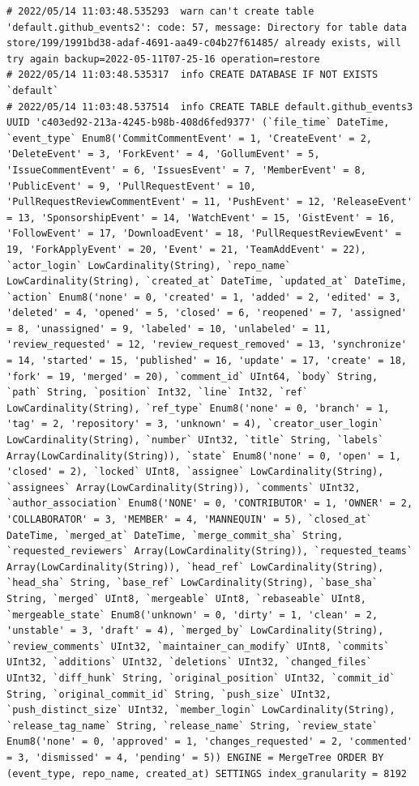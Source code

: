 \begin{verbatim}
# 2022/05/14 11:03:48.535293  warn can't create table 'default.github_events2': code: 57, message: Directory for table data store/199/1991bd38-adaf-4691-aa49-c04b27f61485/ already exists, will try again backup=2022-05-11T07-25-16 operation=restore
# 2022/05/14 11:03:48.535317  info CREATE DATABASE IF NOT EXISTS `default`
# 2022/05/14 11:03:48.537514  info CREATE TABLE default.github_events3 UUID 'c403ed92-213a-4245-b98b-408d6fed9377' (`file_time` DateTime, `event_type` Enum8('CommitCommentEvent' = 1, 'CreateEvent' = 2, 'DeleteEvent' = 3, 'ForkEvent' = 4, 'GollumEvent' = 5, 'IssueCommentEvent' = 6, 'IssuesEvent' = 7, 'MemberEvent' = 8, 'PublicEvent' = 9, 'PullRequestEvent' = 10, 'PullRequestReviewCommentEvent' = 11, 'PushEvent' = 12, 'ReleaseEvent' = 13, 'SponsorshipEvent' = 14, 'WatchEvent' = 15, 'GistEvent' = 16, 'FollowEvent' = 17, 'DownloadEvent' = 18, 'PullRequestReviewEvent' = 19, 'ForkApplyEvent' = 20, 'Event' = 21, 'TeamAddEvent' = 22), `actor_login` LowCardinality(String), `repo_name` LowCardinality(String), `created_at` DateTime, `updated_at` DateTime, `action` Enum8('none' = 0, 'created' = 1, 'added' = 2, 'edited' = 3, 'deleted' = 4, 'opened' = 5, 'closed' = 6, 'reopened' = 7, 'assigned' = 8, 'unassigned' = 9, 'labeled' = 10, 'unlabeled' = 11, 'review_requested' = 12, 'review_request_removed' = 13, 'synchronize' = 14, 'started' = 15, 'published' = 16, 'update' = 17, 'create' = 18, 'fork' = 19, 'merged' = 20), `comment_id` UInt64, `body` String, `path` String, `position` Int32, `line` Int32, `ref` LowCardinality(String), `ref_type` Enum8('none' = 0, 'branch' = 1, 'tag' = 2, 'repository' = 3, 'unknown' = 4), `creator_user_login` LowCardinality(String), `number` UInt32, `title` String, `labels` Array(LowCardinality(String)), `state` Enum8('none' = 0, 'open' = 1, 'closed' = 2), `locked` UInt8, `assignee` LowCardinality(String), `assignees` Array(LowCardinality(String)), `comments` UInt32, `author_association` Enum8('NONE' = 0, 'CONTRIBUTOR' = 1, 'OWNER' = 2, 'COLLABORATOR' = 3, 'MEMBER' = 4, 'MANNEQUIN' = 5), `closed_at` DateTime, `merged_at` DateTime, `merge_commit_sha` String, `requested_reviewers` Array(LowCardinality(String)), `requested_teams` Array(LowCardinality(String)), `head_ref` LowCardinality(String), `head_sha` String, `base_ref` LowCardinality(String), `base_sha` String, `merged` UInt8, `mergeable` UInt8, `rebaseable` UInt8, `mergeable_state` Enum8('unknown' = 0, 'dirty' = 1, 'clean' = 2, 'unstable' = 3, 'draft' = 4), `merged_by` LowCardinality(String), `review_comments` UInt32, `maintainer_can_modify` UInt8, `commits` UInt32, `additions` UInt32, `deletions` UInt32, `changed_files` UInt32, `diff_hunk` String, `original_position` UInt32, `commit_id` String, `original_commit_id` String, `push_size` UInt32, `push_distinct_size` UInt32, `member_login` LowCardinality(String), `release_tag_name` String, `release_name` String, `review_state` Enum8('none' = 0, 'approved' = 1, 'changes_requested' = 2, 'commented' = 3, 'dismissed' = 4, 'pending' = 5)) ENGINE = MergeTree ORDER BY (event_type, repo_name, created_at) SETTINGS index_granularity = 8192

\end{verbatim}
